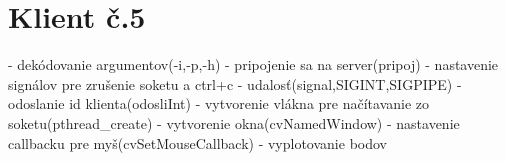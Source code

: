 \documentclass{article}
\begin{document}
\section{Klient č.5}
- dekódovanie argumentov(-i,-p,-h)\newline
- pripojenie sa na server(pripoj)
- nastavenie signálov pre zrušenie soketu a ctrl+c - udalosť(signal,SIGINT,SIGPIPE)\newline
- odoslanie id klienta(odosliInt)\newline
- vytvorenie vlákna pre načítavanie zo soketu(pthread\_create)\newline
- vytvorenie okna(cvNamedWindow)\newline
- nastavenie callbacku pre myš(cvSetMouseCallback)\newline
- vyplotovanie bodov\newline
\end{document}
